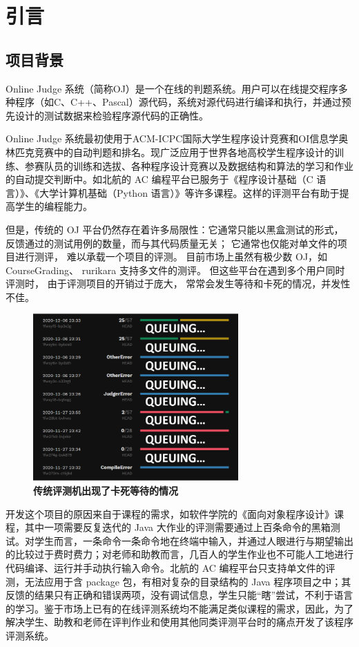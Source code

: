 \chapter{引言}

\section{项目背景}

Online Judge 系统（简称OJ）是一个在线的判题系统。用户可以在线提交程序多种程序（如C、C++、Pascal）源代码，系统对源代码进行编译和执行，并通过预先设计的测试数据来检验程序源代码的正确性。

Online Judge 系统最初使用于ACM-ICPC国际大学生程序设计竞赛和OI信息学奥林匹克竞赛中的自动判题和排名。现广泛应用于世界各地高校学生程序设计的训练、参赛队员的训练和选拔、各种程序设计竞赛以及数据结构和算法的学习和作业的自动提交判断中。如北航的 AC 编程平台已服务于《程序设计基础（C 语言）》、《大学计算机基础（Python 语言）》等许多课程。这样的评测平台有助于提高学生的编程能力。

但是，传统的 OJ 平台仍然存在着许多局限性：它通常只能以黑盒测试的形式， 反馈通过的测试用例的数量，而与其代码质量无关； 它通常也仅能对单文件的项目进行测评， 难以承载一个项目的评测。 目前市场上虽然有极少数 OJ，如 CourseGrading、 rurikara 支持多文件的测评。 但这些平台在遇到多个用户同时评测时， 由于评测项目的开销过于庞大， 常常会发生等待和卡死的情况，并发性不佳。

\begin{figure}[H]
    \centering
    \includegraphics[width=0.7\textwidth]{figure/queuing.png}
    \caption{\textbf{传统评测机出现了卡死等待的情况}}
    \label{fig:queuing}
\end{figure}

开发这个项目的原因来自于课程的需求，如软件学院的《面向对象程序设计》课程，其中一项需要反复迭代的 Java 大作业的评测需要通过上百条命令的黑箱测试。对学生而言，一条命令一条命令地在终端中输入，并通过人眼进行与期望输出的比较过于费时费力；对老师和助教而言，几百人的学生作业也不可能人工地进行代码编译、运行并手动执行输入命令。北航的 AC 编程平台只支持单文件的评测，无法应用于含 package 包，有相对复杂的目录结构的 Java 程序项目之中；其反馈的结果只有正确和错误两项，没有调试信息，学生只能“瞎”尝试，不利于语言的学习。鉴于市场上已有的在线评测系统均不能满足类似课程的需求，因此，为了解决学生、助教和老师在评判作业和使用其他同类评测平台时的痛点开发了该程序评测系统。

